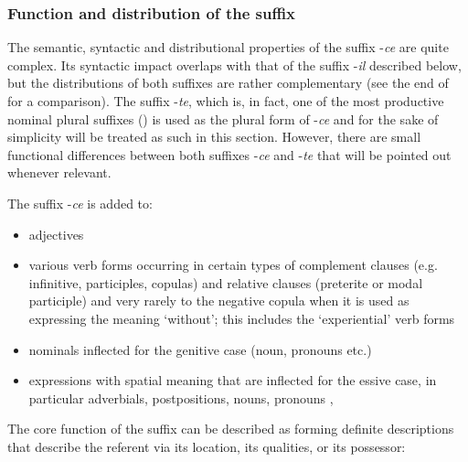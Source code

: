 \subsubsection{Function and distribution of the suffix }
\label{sssec:Function and distribution of the suffix -ce}

The semantic, syntactic and distributional properties of the suffix -\textit{ce} are quite complex. Its syntactic impact overlaps with that of the suffix -\textit{il} described below, but the distributions of both suffixes are rather complementary (see the end of  for a comparison). The suffix -\textit{te}, which is, in fact, one of the most productive nominal plural suffixes () is used as the plural form of -\textit{ce} and for the sake of simplicity will be treated as such in this section. However, there are small functional differences between both suffixes -\textit{ce} and -\textit{te} that will be pointed out whenever relevant.

The suffix -\textit{ce} is added to: 

\begin{itemize}
	\item	adjectives 
	\item	various verb forms occurring in certain types of complement clauses (e.g. infinitive, participles, copulas) and relative clauses (preterite or modal participle) and very rarely to the negative copula when it is used as expressing the meaning `without'; this includes the `experiential' verb forms 
		\item nominals inflected for the genitive case (noun, pronouns etc.) 
	\item	expressions with spatial meaning that are inflected for the essive case, in particular adverbials, postpositions, nouns, pronouns , 
\end{itemize}

The core function of the suffix can be described as forming definite descriptions that describe the referent via its location, its qualities, or its possessor:

